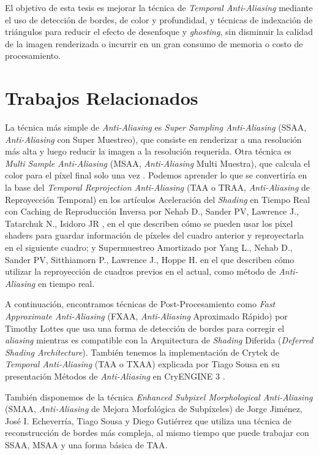 \documentclass{cslthse-msc}
\begin{document}
El objetivo de esta tesis es mejorar la técnica de \textit{Temporal Anti-Aliasing} mediante el uso de detección de bordes, de color y profundidad, y técnicas de indexación de triángulos para reducir el efecto de desenfoque y \textit{ghosting}, sin disminuir la calidad de la imagen renderizada o incurrir en un gran consumo de memoria o costo de procesamiento.


\section{Trabajos Relacionados}
La técnica más simple de \textit{Anti-Aliasing} es \textit{Super Sampling Anti-Aliasing} (SSAA, \textit{Anti-Aliasing} con Super Muestreo), que consiste en renderizar a una resolución más alta y luego reducir la imagen a la resolución requerida. Otra técnica es \textit{Multi Sample Anti-Aliasing} (MSAA, \textit{Anti-Aliasing} Multi Muestra), que calcula el color para el píxel final solo una vez \cite{Doggett2017EDAN35}. Podemos aprender lo que se convertiría en la base del \textit{Temporal Reprojection Anti-Aliasing}  (TAA o TRAA, \textit{Anti-Aliasing} de Reproyección Temporal) en los artículos Aceleración del \textit{Shading} en Tiempo Real con Caching de Reproducción Inversa por Nehab D., Sander PV, Lawrence J., Tatarchuk N., Isidoro JR \cite{Nehab2007}, en el que describen cómo se pueden usar los pixel shaders para guardar información de píxeles del cuadro anterior y reproyectarla en el siguiente cuadro; y Supermuestreo Amortizado por Yang L., Nehab D., Sander PV, Sitthiamorn P., Lawrence J., Hoppe H. \cite{Yang2009} en el que describen cómo utilizar la reproyección de cuadros previos  en el actual, como método de \textit{Anti-Aliasing} en tiempo real.

A continuación, encontramos técnicas de Post-Procesamiento como \textit{Fast Approximate Anti-Aliasing} (FXAA, \textit{Anti-Aliasing} Aproximado Rápido) por Timothy Lottes \cite{Lottes2009} que usa una forma de detección de bordes para corregir el \textit{aliasing} mientras es compatible con la Arquitectura de \textit{Shading} Diferida (\textit{Deferred Shading Architecture}). También tenemos la implementación de Crytek de \textit{Temporal Anti-Aliasing} (TAA o TXAA) explicada por Tiago Sousa en su presentación Métodos de \textit{Anti-Aliasing} en CryENGINE 3 \cite{JIMENEZ2011_SIGGRAPH11}.

También disponemos de la técnica \textit{Enhanced Subpixel Morphological Anti-Aliasing} (SMAA, \textit{Anti-Aliasing} de Mejora Morfológica de Subpíxeles) de Jorge Jiménez, José I. Echeverría, Tiago Sousa y Diego Gutiérrez \cite{Jiménez2012} que utiliza una técnica de reconstrucción de bordes más compleja, al mismo tiempo que puede trabajar con SSAA, MSAA y una forma básica de TAA.
\end{document}
